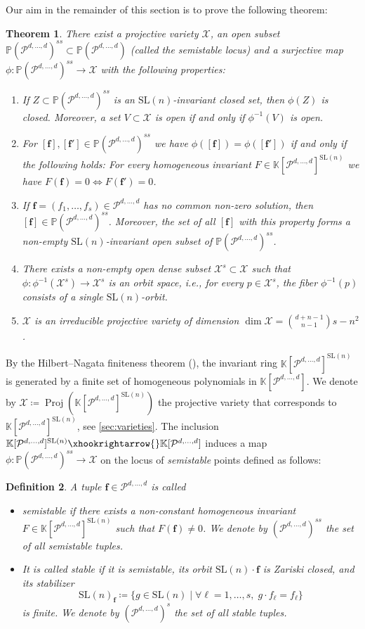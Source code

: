 \documentclass[11pt,a4paper]{article}
\newtheorem{theorem}{Theorem}[section]
\newtheorem{definition}[theorem]{Definition}\AddToHook{env/definition/begin}{\crefalias{theorem}{definition}}
\numberwithin{equation}{section}
\newcommand{\PP}{\mathbb{P}}
\newcommand{\KK}{\mathbb{K}}
\newcommand{\cX}{\mathcal{X}}
\newcommand{\cP}{\mathcal{P}}
\newcommand{\ff}{\ensuremath{\boldsymbol{f}}}
\newcommand{\SL}{\mathrm{SL}}
\DeclareMathOperator{\Proj}{Proj}
\begin{document}
Our aim in the remainder of this section is to prove the following theorem:
\begin{theorem}
\label{thm:git}
    There exist a projective variety $\cX$, an open subset $\PP(\cP^{d,\dots,d})^{ss}\subset\PP(\cP^{d,\dots,d})$ (called the semistable locus) and a surjective map $\phi:\PP(\cP^{d,\dots,d})^{ss}\rightarrow\cX$ with the following properties:
    \begin{enumerate}
        \item If $Z\subset \PP(\cP^{d,\dots,d})^{ss}$ is an $\SL(n)$-invariant closed set, then $\phi(Z)$ is closed.
        Moreover, a set $V\subset \cX$ is open if and only if $\phi^{-1}(V)$ is open.
        \item For $[\ff],[\ff']\in\PP(\cP^{d,\dots,d})^{ss}$ we have $\phi([\ff])=\phi([\ff'])$ if and only if the following holds: For every homogeneous invariant $F\in \KK[\cP^{d,\dots,d}]^{\SL(n)}$ we have $F(\ff)= 0 \iff F(\ff')=0$.
        \item If $\ff=(f_1,\dots,f_s)\in\cP^{d,\dots,d}$ has no common non-zero solution, then $[\ff]\in \PP(\cP^{d,\dots,d})^{ss}$.
        Moreover, the set of all $[\ff]$ with this property forms a non-empty $\SL(n)$-invariant open subset of $\PP(\cP^{d,\dots,d})^{ss}$.
        \item There exists a non-empty open dense subset $\cX^s\subset \cX$ such that $\phi:\phi^{-1}(\cX^s)\rightarrow\cX^s$ is an orbit space, i.e., for every $p\in\cX^s$, the fiber $\phi^{-1}(p)$ consists of a single $\SL(n)$-orbit.
        \item $\cX$ is an irreducible projective variety of dimension $\dim\cX = \binom{d+n-1}{n-1}s-n^2$.
    \end{enumerate}
\end{theorem}

By the Hilbert--Nagata finiteness theorem (\cite[\S 3.3]{Hoskins-12}), the invariant ring
$\KK[\cP^{d,\dots,d}]^{\SL(n)}$ is generated by a finite set of homogeneous polynomials in $\KK[\cP^{d,\dots,d}]$.
We denote by $\cX\coloneqq \Proj(\KK[\cP^{d,\dots,d}]^{\SL(n)})$ the projective variety that corresponds to $\KK[\cP^{d,\dots,d}]^{\SL(n)}$, see \cref{sec:varieties}.
The inclusion $\KK[\cP^{d,\dots,d}]^{\SL(n)}\xhookrightarrow{} \KK[\cP^{d,\dots,d}]$ induces a map $\phi:\PP(\cP^{d,\dots,d})^{ss}\rightarrow\cX$ on the locus of \emph{semistable} points defined as follows:
\begin{definition}
    A tuple $\ff\in\cP^{d,\dots,d}$ is called
    \begin{itemize}
        \item \emph{semistable} if there exists a non-constant homogeneous invariant $F\in \KK[\cP^{d,\dots,d}]^{\SL(n)}$ such that $F(\ff)\neq 0$.
    We denote by $(\cP^{d,\dots,d})^{ss}$ the set of all semistable tuples.
    \item It is called \emph{stable} if it is semistable, its orbit $\SL(n)\cdot\ff$ is Zariski closed, and its stabilizer \[
    \SL(n)_{\ff} \coloneqq \{g\in\SL(n)\mid \forall \ell=1,\dots,s, \; g\cdot f_\ell = f_\ell\}
    \] is finite. 
    We denote by $(\cP^{d,\dots,d})^{s}$ the set of all stable tuples. 
    \end{itemize}
\end{definition}
\end{document}
